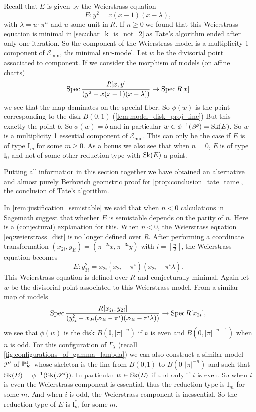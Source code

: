 Recall that $E$ is given by the Weierstrass equation 
\begin{equation}\label{eq:weierstrass_dist}
	E: y^2 = x(x-1)(x-\lambda)
,\end{equation}
with $\lambda = u \cdot \pi^{n}$ and $u$ some unit in $R$. 
If $n \ge 0$ we found that this Weierstrass equation is minimal in  \cref{sec:char_k_is_not_2} as Tate's algorithm ended after only one iteration. 
So the component of the Weierstrass model is a multiplicity 1 component of $\mathscr E_\text{min} $, the minimal snc-model. 
Let $w$ be the divisorial point associated to component.
If we consider the morphism of models (on affine charts) \[
	\operatorname{Spec} \frac{R[x, y]}{(y^2 - x(x-1)(x-\lambda))} \to \operatorname{Spec} R[x]
\]
we see that the map dominates on the special fiber. 
So $\phi(w)$ is the point corresponding to the disk $B(0, 1)$ (\cref{lem:model_disk_proj_line})
But this exactly the point $b$. So $\phi(w) = b$ and in particular $w \in \phi^{-1}(\mathscr P) = \sk(E)$. 
So $w$ is a multiplicity 1 essential component of $\mathscr E_\text{min} $.
This can only be the case if $E$ is of type $\mathrm I_{m}$ for some $m \ge 0$. 
As a bonus we also see that when $n = 0$,  $E$ is of type $\mathrm I_0$ and not of some other reduction type with $\operatorname{Sk}(E)$ a point. 

Putting all information in this section together we have obtained an alternative and almost purely Berkovich geometric proof for \cref{prop:conclusion_tate_tame}, the conclusion of Tate's algorithm. 
\medskip

In \cref{rem:justification_semistable} we said that when $n < 0$ calculations in Sagemath suggest that whether $E$ is semistable depends on the parity of $n$. 
Here is a (conjectural) explanation for this. 
When $n < 0$, the Weierstrass equation \eqref{eq:weierstrass_dist} is no longer defined over $R$. 
After performing a coordinate transformation $(x_{2i}, y_{3i}) = (\pi^{-2i}x, \pi^{-3i}y)$ with $i = \left\lceil \frac{n}{2} \right\rceil $, the Weierstrass equation becomes \[
	E: y_{3i}^2 = x_{2i}(x_{2i}-\pi^{i})(x_{2i} - \pi^{i}\lambda)
.\] 
This Weierstrass equation is defined over $R$ and conjecturally minimal. 
Again let $w$ be the divisorial point associated to this Weierstrass model. 
From a similar map of models \[
	\operatorname{Spec} \frac{R[x_{2i}, y_{2i}]}{\left(y_{3i}^2 - x_{2i}(x_{2i}-\pi^{i})(x_{2i} - \pi^{i}\lambda)\right)} 
	\to \operatorname{Spec} R[x_{2i}]
,\] 
we see that $\phi(w)$ is the disk $B(0, |\pi|^{-n})$ if $n$ is even and $B(0,|\pi|^{-n-1}) $ when $n$ is odd. 
For this configuration of $\Gamma_\lambda$ (recall \cref{fig:configurations_of_gamma_lambda}) we can also construct a similar model $\mathscr P'$ of $\mathbb{P}^{1}_K$ whose skeleton is the line from $B(0, 1)$ to $B(0, |\pi|^{-n})$ and such that $\sk(E) = \phi^{-1}(\sk(\mathscr P'))$.
In particular $w \in \operatorname{Sk}(E)$  if and only if $i$ is even. 
So when $i$ is even the Weierstrass component is essential, thus the reduction type is $\mathrm I_m$ for some $m$. 
And when  $i$ is odd, the Weierstrass component is inessential. 
So the reduction type of $E$ is $\mathrm I_m^*$ for some $m$. 





